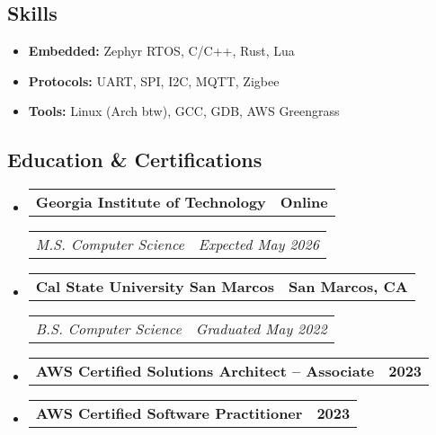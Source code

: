 \documentclass[11pt,letterpaper]{article}
\makeatletter
\newcommand{\headerrow}[2]
{\begin{tabular*}{\linewidth}{l@{\extracolsep{\fill}}r}
#1 &
#2 \\
\end{tabular*}}
\makeatother
\begin{document}
\subsection*{\Large Skills}

\begin{itemize}[leftmargin=1em,noitemsep]
    \item \textbf{Embedded:}
          Zephyr RTOS, C/C++, Rust, Lua
    \item \textbf{Protocols:}
          UART, SPI, I2C, MQTT, Zigbee
    \item \textbf{Tools:}
          Linux (Arch btw), GCC, GDB, AWS Greengrass
\end{itemize}

\subsection*{\Large Education \& Certifications}

\begin{itemize}[leftmargin=1em]
    \parskip=0.1em
        
    \item
        \headerrow
        {\textbf{Georgia Institute of Technology}}
        {\textbf{Online}}
        \headerrow
        {\emph{M.S. Computer Science}}
        {\emph{Expected May 2026}}
        
    \item
        \headerrow
        {\textbf{Cal State University San Marcos}}
        {\textbf{San Marcos, CA}}
        \headerrow
        {\emph{B.S. Computer Science}}
        {\emph{Graduated May 2022}}
        
    \item
        \headerrow
        {\textbf{AWS Certified Solutions Architect -- Associate}}
        {\textbf{2023}}
        
    \item
        \headerrow
        {\textbf{AWS Certified Software Practitioner}}
        {\textbf{2023}}
\end{itemize}
\end{document}
